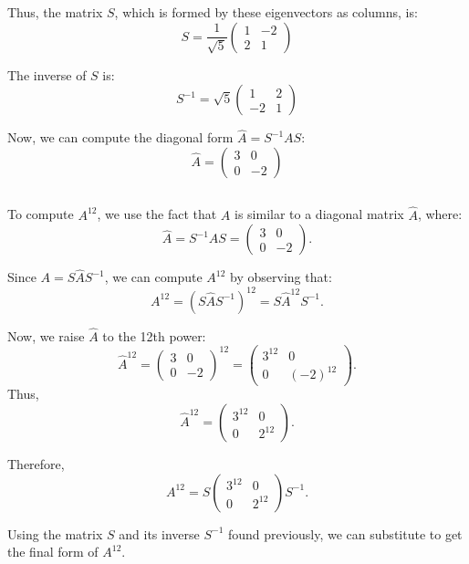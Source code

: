 \documentclass{article}
\begin{document}
Thus, the matrix \( S \), which is formed by these eigenvectors as columns, is:
\[
    S = \frac{1}{\sqrt{5}} \begin{pmatrix} 1 & -2 \\ 2 & 1 \end{pmatrix}
\]

The inverse of \( S \) is:
\[
    S^{-1} = \sqrt{5} \begin{pmatrix} 1 & 2 \\ -2 & 1 \end{pmatrix}
\]

Now, we can compute the diagonal form \( \hat{A} = S^{-1} A S \):
\[
    \hat{A} = \begin{pmatrix} 3 & 0 \\ 0 & -2 \end{pmatrix}
\]
\subsection{}
To compute \( A^{12} \), we use the fact that \( A \) is similar to a diagonal matrix \( \hat{A} \), where:
\[
    \hat{A} = S^{-1} A S = \begin{pmatrix} 3 & 0 \\ 0 & -2 \end{pmatrix}.
\]

Since \( A = S \hat{A} S^{-1} \), we can compute \( A^{12} \) by observing that:
\[
    A^{12} = \left(S \hat{A} S^{-1}\right)^{12} = S \hat{A}^{12} S^{-1}.
\]

Now, we raise \( \hat{A} \) to the 12th power:
\[
    \hat{A}^{12} = \begin{pmatrix} 3 & 0 \\ 0 & -2 \end{pmatrix}^{12} = \begin{pmatrix} 3^{12} & 0 \\ 0 & (-2)^{12} \end{pmatrix}.
\]
Thus,
\[
    \hat{A}^{12} = \begin{pmatrix} 3^{12} & 0 \\ 0 & 2^{12} \end{pmatrix}.
\]

Therefore,
\[
    A^{12} = S \begin{pmatrix} 3^{12} & 0 \\ 0 & 2^{12} \end{pmatrix} S^{-1}.
\]

Using the matrix \( S \) and its inverse \( S^{-1} \) found previously, we can substitute to get the final form of \( A^{12} \).
\end{document}
